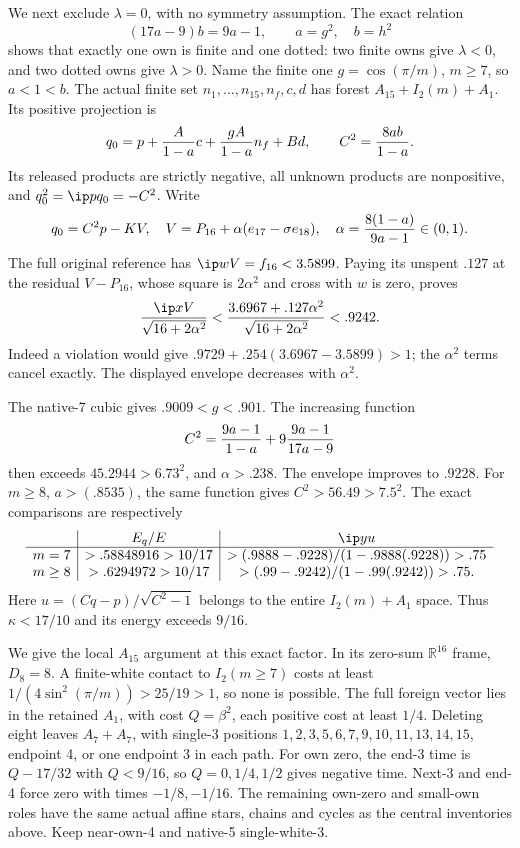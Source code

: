 We next exclude \(\lambda=0\), with no symmetry assumption.
The exact relation
\[
 (17a-9)b=9a-1,\qquad a=g^2,\quad b=h^2
\]
shows that exactly one own is finite and one dotted: two finite
owns give \(\lambda<0\), and two dotted owns give \(\lambda>0\).
Name the finite one \(g=\cos(\pi/m)\), \(m\ge7\), so \(a<1<b\).
The actual finite set \(n_1,\ldots,n_{15},n_f,c,d\) has
forest \(A_{15}+I_2(m)+A_1\).
Its positive projection is
\[
 q_0=p+{A\over1-a}c+{gA\over1-a}n_f+Bd,\qquad
 C^2={8ab\over1-a}.
\]
Its released products are strictly negative, all unknown products
are nonpositive, and \(q_0^2=\ip p{q_0}=-C^2\).
Write
\[
 q_0=C^2p-KV,\quad V=P_{16}+\alpha(e_{17}-\sigma e_{18}),
 \quad \alpha={8(1-a)\over9a-1}\in(0,1).
\]
The full original reference has
\(\ip wV=f_{16}<3.5899\).
Paying its unspent \(.127\) at the residual \(V-P_{16}\),
whose square is \(2\alpha^2\) and cross with \(w\) is zero,
proves
\[
 {\ip xV\over\sqrt{16+2\alpha^2}}
 <{3.6967+.127\alpha^2\over\sqrt{16+2\alpha^2}}<.9242.
\]
Indeed a violation would give
\(.9729+.254(3.6967-3.5899)>1\);
the \(\alpha^2\) terms cancel exactly.
The displayed envelope decreases with \(\alpha^2\).

The native-7 cubic gives \(.9009<g<.901\).
The increasing function
\[
 C^2={9a-1\over1-a}
          +9{9a-1\over17a-9}
\]
then exceeds \(45.2944>6.73^2\), and \(\alpha>.238\).
The envelope improves to \(.9228\).
For \(m\ge8\), \(a>(.8535)\), the same function gives
\(C^2>56.49>7.5^2\).
The exact comparisons are respectively
\[
 \begin{array}{c|c|c}
 &E_q/E&\ip yu\\ \hline
 m=7&>.58848916>10/17&
       >(.9888-.9228)/(1-.9888(.9228))>.75\\
 m\ge8&>.6294972>10/17&
       >(.99-.9242)/(1-.99(.9242))>.75 .
 \end{array}
\]
Here \(u=(Cq-p)/\sqrt{C^2-1}\) belongs to the entire
\(I_2(m)+A_1\) space.  Thus \(\kappa<17/10\) and
its energy exceeds \(9/16\).

We give the local \(A_{15}\) argument at this exact factor.
In its zero-sum \(\mathbb R^{16}\) frame, \(D_8=8\).
A finite-white contact to \(I_2(m\ge7)\) costs at least
\(1/(4\sin^2(\pi/m))>25/19>1\), so none is possible.
The full foreign vector lies in the retained \(A_1\), with cost
\(Q=\beta^2\), each positive cost at least \(1/4\).
Deleting eight leaves \(A_7+A_7\), with single-3 positions
\(1,2,3,5,6,7,9,10,11,13,14,15\), endpoint 4,
or one endpoint 3 in each path.
For own zero, the end-3 time is \(Q-17/32\) with
\(Q<9/16\), so \(Q=0,1/4,1/2\) gives negative time.
Next-3 and end-4 force zero with times \(-1/8,-1/16\).
The remaining own-zero and small-own roles have the same actual
affine stars, chains and cycles as the central inventories above.
Keep near-own-4 and native-5 single-white-3.

